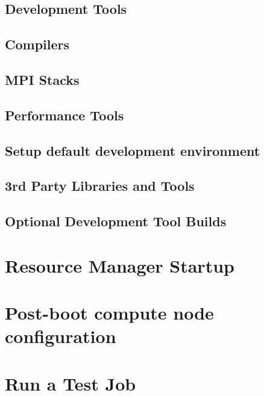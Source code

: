 \documentclass{ohpc-doc}
\begin{document}
\section{Development Tools} \label{sec:install_dev_tools}


\section{Compilers} \label{sec:install_compilers}


\section{MPI Stacks} \label{sec:mpi}


\section{Performance Tools} \label{sec:install_perf_tools}


\section{Setup default development environment}


\section{3rd Party Libraries and Tools} \label{sec:3rdparty}




\section{Optional Development Tool Builds} \label{sec:3rdparty_intel}


\chapter{Resource Manager Startup} \label{sec:rms_startup}


\chapter{Post-boot compute node configuration} \label{sec:post_boot}


\chapter{Run a Test Job} \label{sec:test_job}


\appendix







\end{document}
